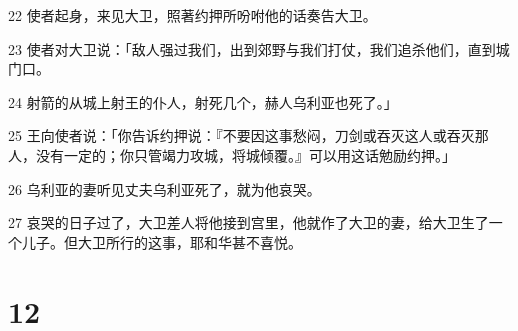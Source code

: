 \par 22 使者起身，来见大卫，照著约押所吩咐他的话奏告大卫。
\par 23 使者对大卫说：「敌人强过我们，出到郊野与我们打仗，我们追杀他们，直到城门口。
\par 24 射箭的从城上射王的仆人，射死几个，赫人乌利亚也死了。」
\par 25 王向使者说：「你告诉约押说：『不要因这事愁闷，刀剑或吞灭这人或吞灭那人，没有一定的；你只管竭力攻城，将城倾覆。』可以用这话勉励约押。」
\par 26 乌利亚的妻听见丈夫乌利亚死了，就为他哀哭。
\par 27 哀哭的日子过了，大卫差人将他接到宫里，他就作了大卫的妻，给大卫生了一个儿子。但大卫所行的这事，耶和华甚不喜悦。

\chapter{12}

